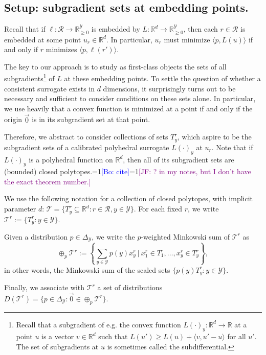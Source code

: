 \documentclass[anon]{colt2020} %
\newcommand{\Comments}{1}
\newcommand{\mynote}[2]{\ifnum\Comments=1\textcolor{#1}{#2}\fi}
\newcommand{\jessie}[1]{\mynote{purple}{[JF: #1]}}
\newcommand{\bo}[1]{\mynote{blue}{[Bo: #1]}}
\newcommand{\reals}{\mathbb{R}}
\newcommand{\nonnegreals}{\reals_{\geq 0}}%
\newcommand{\simplex}{\Delta_\Y}
\newcommand{\R}{\mathcal{R}}
\newcommand{\T}{\mathcal{T}}
\newcommand{\Y}{\mathcal{Y}}
\newcommand{\inprod}[2]{\langle #1, #2 \rangle}%
\begin{document}
\subsection{Setup: subgradient sets at embedding points.}\label{subsec:sub-sets}

Recall that if $\ell: \R \to \nonnegreals^{\Y}$ is embedded by $L: \reals^d \to \nonnegreals^{\Y}$, then each $r \in \R$ is embedded at some point $u_r \in \reals^d$.
In particular, $u_r$ must minimize $\inprod{p}{L(u)}$ if and only if $r$ minimizes $\inprod{p}{\ell(r')}$.

The key to our approach is to study as first-class objects the sets of all subgradients\footnote{Recall that a subgradient of e.g. the convex function $L(\cdot)_y: \reals^d \to \reals$ at a point $u$ is a vector $v \in \reals^d$ such that $L(u') \geq L(u) + \inprod{v}{u'-u}$ for all $u'$. The set of subgradients at $u$ is sometimes called the subdifferential.} of $L$ at these embedding points.
To settle the question of whether a consistent surrogate exists in $d$ dimensions, it surprisingly turns out to be necessary and sufficient to consider conditions on these sets alone.
In particular, we use heavily that a convex function is minimized at a point if and only if the origin $\vec{0}$ is in its subgradient set at that point.

Therefore, we abstract to consider collections of sets $T^r_y$, which aspire to be the subgradient sets of a calibrated polyhedral surrogate $L(\cdot)_y$ at $u_r$.
Note that if $L(\cdot)_y$ is a polyhedral function on $\reals^d$, then all of its subgradient sets are (bounded) closed polytopes.\bo{cite}\jessie{\cite{rockafellar1997convex} ? in my notes, but I don't have the exact theorem number.}

\begin{definition}[$\T$, $\T^r$, $D(\T^r)$]
  We use the following notation for a collection of closed polytopes, with implicit parameter $d$: $\T = \{T^r_y \subseteq \reals^d : r \in \R, y \in \Y\}$.
  For each fixed $r$, we write $\T^r := \{T^r_y : y \in \Y\}$.

  Given a distribution $p \in \simplex$, we write the $p$-weighted Minkowski sum of $\T^r$ as
    \[ \oplus_p \T^r := \left\{ \sum_{y \in \Y} p(y) x^r_y ~\Big|~ x^r_1 \in T^r_1, \dots, x^r_y \in T^r_y \right\} , \]
  in other words, the Minkowski sum of the scaled sets $\{p(y) T^r_y : y \in \Y\}$.

  Finally, we associate with $\T^r$ a set of distributions $D(\T^r) = \{ p \in \simplex : \vec 0 \in \oplus_p \T^r\}$.
\end{definition}
\end{document}
